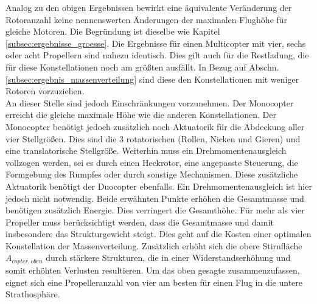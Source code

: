 Analog zu den obigen Ergebnissen bewirkt eine äquivalente Veränderung der Rotoranzahl keine nennenswerten Änderungen der maximalen Flughöhe für gleiche Motoren. Die Begründung ist dieselbe wie Kapitel \ref{subsec:ergebnisse_groesse}. Die Ergebnisse für einen Multicopter mit vier, sechs oder acht Propellern sind nahezu identisch. Dies gilt auch für die Restladung, die für diese Konstellationen noch am größten ausfällt. In Bezug auf Abschn. \ref{subsec:ergebnis_massenverteilung} sind diese den Konstellationen mit weniger Rotoren vorzuziehen. \\
An dieser Stelle sind jedoch Einschränkungen vorzunehmen. 
Der Monocopter erreicht die gleiche maximale Höhe wie die anderen Konstellationen. Der Monocopter benötigt jedoch zusätzlich noch Aktuatorik für die Abdeckung aller vier Stellgrößen. Dies sind die 3 rotatorischen (Rollen, Nicken und Gieren) und eine translatorische Stellgröße. Weiterhin muss ein Drehmomentenausgleich vollzogen werden, sei es durch einen Heckrotor, eine angepasste Steuerung, die Formgebung des Rumpfes oder durch sonstige Mechanismen. Diese zusätzliche Aktuatorik benötigt der Duocopter ebenfalls. Ein Drehmomentenausgleich ist hier jedoch nicht notwendig.
Beide erwähnten Punkte erhöhen die Gesamtmasse und benötigen zusätzlich Energie. Dies verringert die Gesamthöhe. 
Für mehr als vier Propeller muss berücksichtigt werden, dass die Gesamtmasse und damit insbesondere das Strukturgewicht steigt. Dies geht auf die Kosten einer optimalen Konstellation der Massenverteilung. Zusätzlich erhöht sich die obere Stirnfläche \ensuremath{A_{copter,oben}} durch stärkere Strukturen, die in einer Widerstandserhöhung und somit erhöhten Verlusten resultieren. Um das oben gesagte zusammenzufassen, eignet sich eine Propelleranzahl von vier am besten für einen Flug in die untere Strathosphäre. 



